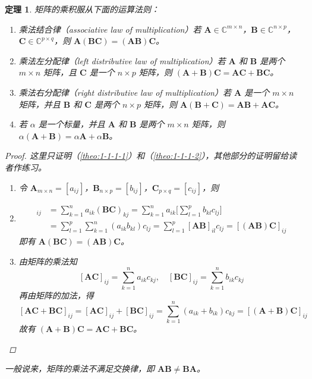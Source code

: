 \documentclass[punct=kaiming, fontset=fandol]{ctexbook}
\numberwithin{equation}{section}
\theoremstyle{mystyle}
\newtheorem{theo}{定理}[section]
\def\bf#1{\symbfit{#1}}
\def\bb#1{\symbb{#1}}
\def\bf#1{\bm{#1}}
\def\bb#1{\mathbb{#1}}
\begin{document}
  \begin{theo}
    矩阵的乘积服从下面的运算法则：
    \begin{enumerate}
      \item \label{theo:1-1-1-1}乘法结合律（associative law of multiplication）若 $\bf A \in \bb C^{m \times n}$，$\bf B \in \bb C^{n \times p}$，$\bf C \in \bb C^{p \times q}$，则 $\bf A(\bf B \bf C) = (\bf A \bf B)\bf C$。
      \item \label{theo:1-1-1-2}乘法左分配律（left distributive law of multiplication）若 $\bf A$ 和 $\bf B$ 是两个 $m \times n$ 矩阵，且 $\bf C$ 是一个 $n \times p$ 矩阵，则 $(\bf A + \bf B) \bf C = \bf A \bf C + \bf B \bf C$。
      \item 乘法右分配律（right distributive law of multiplication）若 $\bf A$ 是一个 $m \times n$ 矩阵，并且 $\bf B$ 和 $\bf C$ 是两个 $n \times p$ 矩阵，则 $\bf A (\bf B + \bf C) = \bf A \bf B + \bf A \bf C$。
      \item 若 $\alpha$ 是一个标量，并且 $\bf A$ 和 $\bf B$ 是两个 $m \times n$ 矩阵，则 $\alpha ( \bf A + \bf B) = \alpha \bf A + \alpha \bf B$。
    \end{enumerate}
    \begin{proof}
      这里只证明（\ref{theo:1-1-1-1}）和（\ref{theo:1-1-1-2}），其他部分的证明留给读者作练习。
      \begin{enumerate}
        \item 令 $\bf A_{m \times n} = [a_{ij}]$，$\bf B_{n \times p} = [b_{ij}]$，$\bf C_{p \times q} = [c_{ij}]$，则
        \item \begin{align*}
          [\bf A (\bf B \bf C)]_{ij}  &= \sum_{k=1}^n a_{ik} (\bf B \bf C)_{kj}           = \sum_{k=1}^n a_{ik} \Biggl[ \sum_{l=1}^p b_{kl} c_{lj} \Biggr]  \\
                                      &= \sum_{l=1}^p \sum_{k=1}^n (a_{ik} b_{kl}) c_{lj} = \sum_{l=1}^p [\bf A \bf B]_{il} c_{lj} = [(\bf A \bf B) \bf C]_{ij}
        \end{align*}
        即有 $\bf A (\bf B \bf C) = (\bf A \bf B) \bf C$。
        \item 由矩阵的乘法知
        \[
          [\bf A \bf C]_{ij} = \sum_{k=1}^n a_{ik} c_{kj}, \quad [\bf B \bf C]_{ij} = \sum_{k=1}^n b_{ik} c_{kj}
        \]
        再由矩阵的加法，得
        \[
          [\bf A \bf C + \bf B \bf C]_{ij} = [\bf A \bf C]_{ij} + [\bf B \bf C]_{ij} = \sum_{k=1}^n (a_{ik} + b_{ik}) c_{kj} = [(\bf A + \bf B) \bf C]_{ij}
        \]
        故有 $(\bf A + \bf B) \bf C = \bf A \bf C + \bf B \bf C$。
      \end{enumerate}
    \end{proof}
    一般说来，矩阵的乘法不满足交换律，即 $\bf A \bf B \ne \bf B \bf A$。
  \end{theo}
\end{document}
